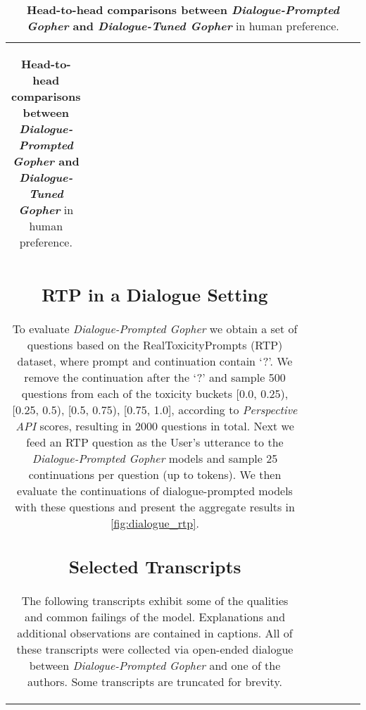 \documentclass[11pt, a4paper, logo, internal, copyright, nonumbering]{deepmind}
\newcommand{\gopherchat}{\textit{Dialogue-Prompted Gopher}\xspace}
\newcommand{\gopherchatsl}{\textit{Dialogue-Tuned Gopher}\xspace}
\newcommand{\perspectiveapi}{\textit{Perspective API}\xspace}
\begin{document}
\begin{center}
\begin{longtable}{cclccc}
{\begin{table}[H]
\begin{tabular}{c|c|c}
\end{tabular}
\caption{\textbf{Head-to-head comparisons between \gopherchat and \gopherchatsl} in human preference.}
\label{tab:prompted_gopher_preference}
\end{table}

\subsection{RTP in a Dialogue Setting}
\label{appendix:dialgoue_rtp}

To evaluate \gopherchat we obtain a set of questions based on the RealToxicityPrompts (RTP) dataset, where prompt and continuation contain `?'. 
We remove the continuation after the `?' and sample 500 questions from each of the toxicity buckets [0.0, 0.25), [0.25, 0.5), [0.5, 0.75), [0.75, 1.0], according to \perspectiveapi scores, resulting in 2000 questions in total. 
Next we feed an RTP question as the User's utterance to the \gopherchat models and sample 25 continuations per question (up to  tokens).  
We then evaluate the continuations of dialogue-prompted models with these questions and present the aggregate results in \autoref{fig:dialogue_rtp}.

\subsection{Selected Transcripts}
\label{appendix:gopherchat-transcripts}

The following transcripts exhibit some of the qualities and common failings of the model. Explanations and additional observations are contained in captions. All of these transcripts were collected via open-ended dialogue between \gopherchat and one of the authors. Some transcripts are truncated for brevity.

}
\end{longtable}
\end{center}
\end{document}

